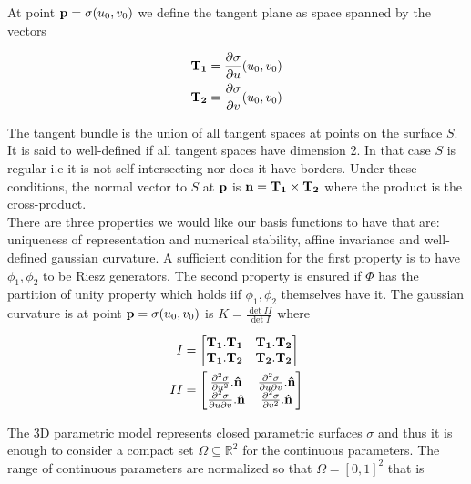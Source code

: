 \documentclass[a4paper, 11pt]{article}
\begin{document}
At point ${\bf p} = \sigma(u_0, v_0)$ we define the tangent plane as space spanned by the vectors 

\begin{align}
  {\bf T_1} &= \frac{\partial \sigma}{\partial u}(u_0, v_0) \\
  {\bf T_2} &= \frac{\partial \sigma}{\partial v}(u_0, v_0)
\end{align}

The tangent bundle is the union of all tangent spaces at points on the surface $S$. It is said to well-defined if all 
tangent spaces have dimension 2. In that case $S$ is regular i.e it is not self-intersecting nor does it have borders.  
Under these conditions, the normal vector to $S$ at ${\bf p}$ is ${\bf n} = {\bf T_1} \times {\bf T_2}$ where the 
product is the cross-product. \\

There are three properties we would like our basis functions to have that are: uniqueness of representation and 
numerical stability, affine invariance and well-defined gaussian curvature. A sufficient condition for the first 
property is to have $\phi_1, \phi_2$ to be Riesz generators. The second property is ensured if $\Phi$ has the partition 
of unity property which holds iif $\phi_1, \phi_2$ themselves have it. The gaussian curvature is at point ${\bf p} = 
\sigma(u_0, v_0)$ is $K = \frac{\det II}{\det I}$ where

\begin{align}
  I &= \begin{bmatrix} {\bf T_1.T_1} & {\bf T_1.T_2} \\ {\bf T_1.T_2} & {\bf T_2.T_2} \\ \end{bmatrix} \\
  II &= \begin{bmatrix} \frac{\partial^2 \sigma}{\partial u^2}.{\bf \hat{n}} & \frac{\partial^2 \sigma}{\partial 
  u\partial v}.{\bf \hat{n}} \\ \frac{\partial^2 \sigma}{\partial u \partial v}.{\bf \hat{n}} & \frac{\partial^2 
\sigma}{\partial v^2}.{\bf \hat{n}} \end{bmatrix}
\end{align}

The 3D parametric model represents closed parametric surfaces $\sigma$ and thus it is enough to consider a compact set 
$\Omega \subseteq \mathbb{R}^2$ for the continuous parameters. The range of continuous parameters are normalized so that 
$\Omega = {[0,1]}^2$ that is 
\end{document}
